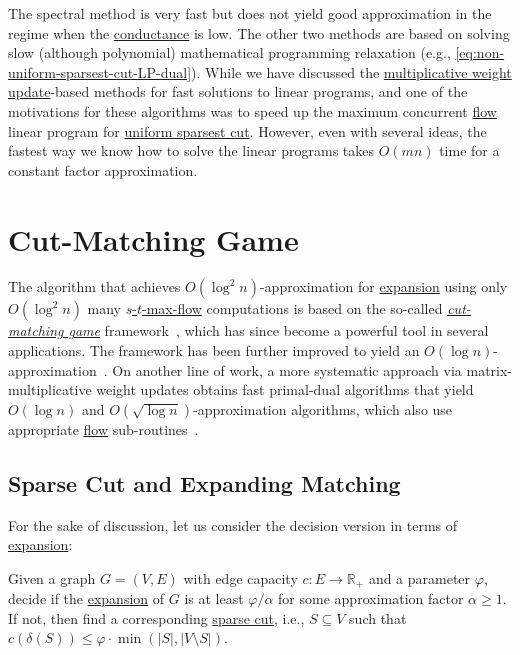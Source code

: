 The spectral method is very fast but does not yield good approximation in the regime when the \hyperref[def:conductance]{conductance} is low. The other two methods are based on solving slow (although polynomial) mathematical programming relaxation (e.g., \autoref{eq:non-uniform-sparsest-cut-LP-dual}). While we have discussed the \hyperref[algo:MWU-discrete-non-uniform]{multiplicative weight update}-based methods for fast solutions to linear programs, and one of the motivations for these algorithms was to speed up the maximum concurrent \hyperref[def:flow]{flow} linear program for \hyperref[prb:sparsest-cut]{uniform sparsest cut}. However, even with several ideas, the fastest way we know how to solve the linear programs takes \(O(mn)\) time for a constant factor approximation.

\section{Cut-Matching Game}
The algorithm that achieves \(O(\log ^2 n)\)-approximation for \hyperref[def:expansion]{expansion} using only \(O(\log ^2 n)\) many \hyperref[prb:s-t-max-flow]{\(s\)-\(t\)-max-flow} computations is based on the so-called \hyperref[def:cut-matching-game]{\emph{cut-matching game}} framework~\cite{khandekar2009graph}, which has since become a powerful tool in several applications. The framework has been further improved to yield an \(O(\log n)\)-approximation~\cite{orecchia2008partitioning}. On another line of work, a more systematic approach via matrix-multiplicative weight updates obtains fast primal-dual algorithms that yield \(O(\log n)\) and \(O(\sqrt{\log n} )\)-approximation algorithms, which also use appropriate \hyperref[def:flow]{flow} sub-routines~\cite{arora2007combinatorial}.

\subsection{Sparse Cut and Expanding Matching}
For the sake of discussion, let us consider the decision version in terms of \hyperref[def:expansion]{expansion}:

\begin{problem}[Expansion]\label{prb:expansion}
Given a graph \(G = (V, E)\) with edge capacity \(c\colon E \to \mathbb{R} _{+}\) and a parameter \(\varphi \), decide if the \hyperref[def:expansion]{expansion} of \(G\) is at least \(\varphi / \alpha \) for some approximation factor \(\alpha \geq 1\). If not, then find a corresponding \hyperref[prb:sparsest-cut]{sparse cut}, i.e., \(S \subseteq V\) such that \(c(\delta (S)) \leq \varphi \cdot \min (\lvert S \rvert , \lvert V \setminus S \rvert )\).
\end{problem}

